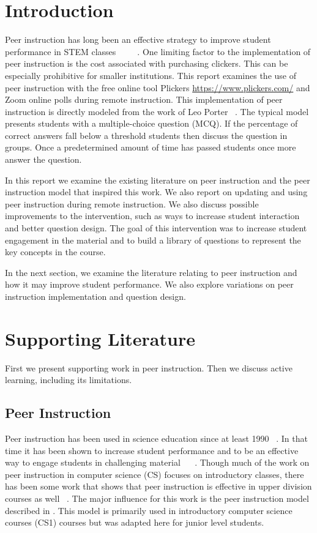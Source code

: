 \documentclass{article}
\begin{document}
\section{Introduction}
Peer instruction has long been an effective strategy to improve student performance in STEM classes ~\cite{porterMultiinstitutionalStudyPeer2016} ~\cite{porterHalvingFailRates2013} ~\cite{simonExperienceReportPeer2010a}. One limiting factor to the implementation of peer instruction is the cost associated with purchasing clickers.  This can be especially prohibitive for smaller institutions.  
This report examines the use of peer instruction with the free online tool Plickers \url{https://www.plickers.com/} and Zoom online polls during remote instruction.  
This implementation of peer instruction is directly modeled from the work of Leo Porter ~\cite{porterMultiinstitutionalStudyPeer2016}.  The typical model presents students with a multiple-choice question (MCQ). If the percentage of correct answers fall below a threshold students then discuss the question in groups. Once a predetermined amount of time has passed students once more answer the question.

In this report we examine the existing literature on peer instruction and the peer instruction model that inspired this work.  We also report on updating and using peer instruction during remote instruction.  We also discuss possible improvements to the intervention, such as ways to increase student interaction and better question design. The goal of this intervention was to increase student engagement in the material and to build a library of questions to represent the key concepts in the course. 

In the next section, we examine the literature relating to peer instruction and how it may improve student performance.  We also explore variations on peer instruction implementation and question design. 

\section{Supporting Literature}
First we present supporting work in peer instruction.  Then we discuss active learning, including its limitations. 

\subsection{Peer Instruction}
Peer instruction has been used in science education since at least 1990 ~\cite{crouchPeerInstructionTen2001}. In that time it has been shown to increase student performance and to be an effective way to engage students in challenging material ~\cite{simonExperienceReportPeer2010a} ~\cite{porterMultiinstitutionalStudyPeer2016}. Though much of the work on peer instruction in computer science (CS) focuses on introductory classes, there has been some work that shows that peer instruction is effective in upper division courses as well ~\cite{leeCanPeerInstruction2013}.
The major influence for this work is the peer instruction model described in \cite{porterPeerInstructionStudents2011}. This model is primarily used in introductory computer science courses (CS1) courses but was adapted here for junior level students. 
\end{document}
